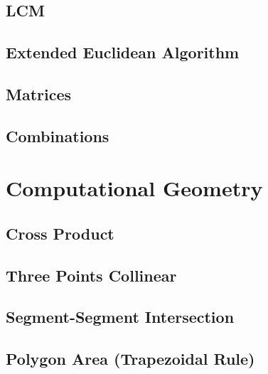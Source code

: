 \documentclass[11pt, letterpaper]{article}
\begin{document}
\subsection{LCM}


\subsection{Extended Euclidean Algorithm}


\subsection{Matrices}


\subsection{Combinations}


\section{Computational Geometry}

\subsection{Cross Product}


\subsection{Three Points Collinear}


\subsection{Segment-Segment Intersection}


\subsection{Polygon Area (Trapezoidal Rule)}

\end{document}
